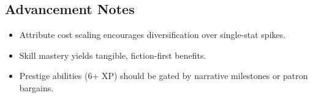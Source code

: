 \subsection{Advancement Notes}
\begin{itemize}
  \item Attribute cost scaling encourages diversification over single-stat spikes.
  \item Skill mastery yields tangible, fiction-first benefits.
  \item Prestige abilities (6+ XP) should be gated by narrative milestones or patron bargains.
\end{itemize}
